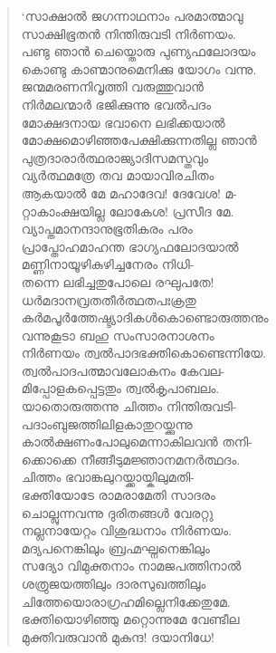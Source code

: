 \begin{verse}
‘സാക്ഷാല്‍ ജഗന്നാഥനാം പരമാത്മാവു\\
സാക്ഷിഭൂതന്‍ നിന്തിരുവടി നിര്‍ണയം.\\
പണ്ടു ഞാന്‍ ചെയ്തൊരു പുണ്യഫലോദയം\\
കൊണ്ടു കാണ്മാനുമെനിക്കു യോഗം വന്നു.\\
ജന്മമരണനിവൃത്തി വരുത്തുവാന്‍\\
നിര്‍മലന്മാര്‍ ഭജിക്കുന്നു ഭവല്‍പദം\\
മോക്ഷദനായ ഭവാനെ ലഭിക്കയാല്‍\\
മോക്ഷമൊഴിഞ്ഞപേക്ഷിക്കുന്നതില്ല ഞാന്‍\\
പുത്രദാരാര്‍ത്ഥരാജ്യാദിസമസ്തവും\\
വ്യര്‍ത്ഥമത്രേ തവ മായാവിരചിതം\\
ആകയാല്‍ മേ മഹാദേവ! ദേവേശ! മ-\\
റ്റാകാംക്ഷയില്ല ലോകേശ! പ്രസീദ മേ.\\
വ്യാപ്തമാനന്ദാനുഭൂതികരം പരം\\
പ്രാപ്തോഹമാഹന്ത ഭാഗ്യഫലോദയാല്‍\\
മണ്ണിനായൂഴികുഴിച്ചനേരം നിധി-\\
തന്നെ ലഭിച്ചതുപോലെ രഘുപതേ!\\
ധര്‍മദാനവ്രതതീര്‍ത്ഥതപഃക്രതു\\
കര്‍മപൂര്‍ത്തേഷ്ട്യാദികള്‍കൊണ്ടൊരുത്തനും\\
വന്നുകൂടാ ബഹു സംസാരനാശനം\\
നിര്‍ണയം ത്വല്‍പാദഭക്തികൊണ്ടെന്നിയേ.\\
ത്വല്‍പാദപത്മാവലോകനം കേവല-\\
മിപ്പോളകപ്പെട്ടതും ത്വല്‍കൃപാബലം.\\
യാതൊരുത്തന്നു ചിത്തം നിന്തിരുവടി-\\
പദാംബുജത്തിലിളകാതുറയ്ക്കുന്നു\\
കാല്‍ക്ഷണംപോലുമെന്നാകിലവന്‍ തനി-\\
ക്കൊക്കെ നീങ്ങീടുമജ്ഞാനമനര്‍ത്ഥദം.\\
ചിത്തം ഭവാങ്കലുറയ്ക്കായ്കിലുമതി-\\
ഭക്തിയോടേ രാമരാമേതി സാദരം\\
ചൊല്ലുന്നവന്നു ദുരിതങ്ങള്‍ വേരറ്റു\\
നല്ലനായേറ്റം വിശുദ്ധനാം നിര്‍ണയം.\\
മദ്യപനെങ്കിലും ബ്രഹ്മഘ്നനെങ്കിലും\\
സദ്യോ വിമുക്തനാം നാമജപത്തിനാല്‍\\
ശത്രുജയത്തിലും ദാരസുഖത്തിലും\\
ചിത്തേയൊരാഗ്രഹമില്ലെനിക്കേതുമേ.\\
ഭക്തിയൊഴിഞ്ഞു മറ്റൊന്നുമേ വേണ്ടീല\\
മുക്തിവരുവാന്‍ മുകുന്ദ! ദയാനിധേ!\\

\end{verse}

